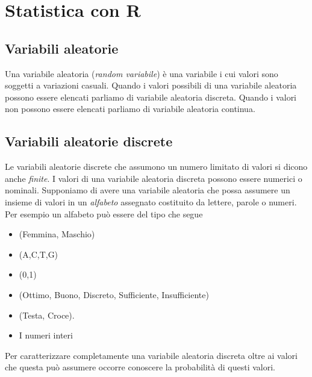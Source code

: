 \documentclass[onecolumn,12pt]{book}
\author{Federico Comoglio e  Maurizio Rinaldi}
\begin{document}

\markright{\today}
\thispagestyle{empty}
\maketitle
\newpage
\thispagestyle{empty}
\tableofcontents
\newpage
\thispagestyle{empty}
 \mainmatter
\chapter{Statistica con \textsf{R}}
\section{Variabili aleatorie}
Una variabile aleatoria (\emph{random variabile}) \`e
 una variabile i cui valori sono soggetti a variazioni casuali. Quando i valori possibili di una variabile aleatoria  possono essere elencati parliamo di variabile aleatoria discreta. Quando i valori non possono essere elencati parliamo di variabile aleatoria continua.

\section{Variabili aleatorie discrete}
Le variabili aleatorie  discrete che  assumono un numero limitato di valori si dicono anche \emph{finite}.  I valori di una variabile aleatoria discreta possono essere numerici o nominali.
 Supponiamo di avere una variabile aleatoria che possa assumere un insieme di valori in  un \emph{alfabeto} assegnato costituito da lettere, parole o numeri. Per esempio un alfabeto pu\`o essere del tipo che segue
\begin{itemize}
\item{}(Femmina, Maschio)
\item{}(A,C,T,G)
\item{} (0,1)
\item{}(Ottimo, Buono, Discreto, Sufficiente, Insufficiente)
\item{} (Testa, Croce).
\item{} I numeri interi
\end{itemize}
Per caratterizzare completamente una variabile aleatoria discreta oltre ai valori che questa pu\`o  assumere occorre conoscere la probabilit\`a  di questi valori.
\end{document}
